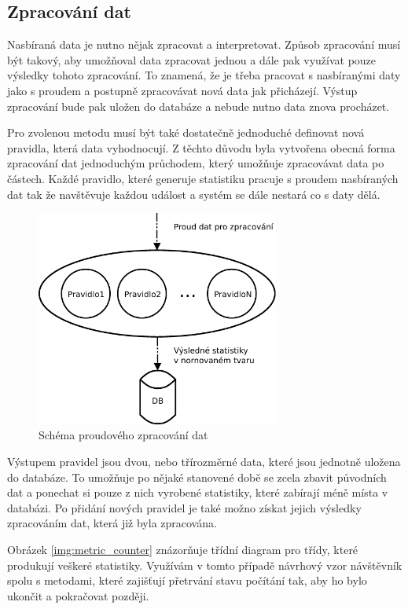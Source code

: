 \documentclass[bc,male,java,dept456]{diploma}						%
\begin{document}
\subsection{Zpracování dat}

Nasbíraná data je nutno nějak zpracovat a interpretovat. Způsob zpracování musí být takový, aby umožňoval data zpracovat jednou a dále pak využívat pouze výsledky tohoto zpracování. To znamená, že je třeba pracovat s nasbíranými daty jako s proudem a postupně zpracovávat nová data jak přicházejí. Výstup zpracování bude pak uložen do databáze a nebude nutno data znova procházet.

Pro zvolenou metodu musí být také dostatečně jednoduché definovat nová pravidla, která data vyhodnocují. Z těchto důvodu byla vytvořena obecná forma zpracování dat jednoduchým průchodem, který umožňuje zpracovávat data po částech. Každé pravidlo, které generuje statistiku pracuje s proudem nasbíraných dat tak že navštěvuje každou událost a systém se dále nestará co s daty dělá.

\begin{figure}[h]
	\centering
	\includegraphics[width=8cm]{img/zpracovani_2.pdf}
	\caption{Schéma proudového zpracování dat}
	\label{img:measuring}
\end{figure}

Výstupem pravidel jsou dvou, nebo třírozměrné data, které jsou jednotně uložena do databáze. To umožňuje po nějaké stanovené době se zcela zbavit původních dat a ponechat si pouze z nich vyrobené statistiky, které zabírají méně místa v databázi. Po přidání nových pravidel je také možno získat jejich výsledky zpracováním dat, která již byla zpracována.

Obrázek \ref{img:metric_counter} znázorňuje třídní diagram pro třídy, které produkují veškeré statistiky. Využívám v tomto případě návrhový vzor návštěvník\cite{visitor} spolu s metodami, které za\-ji\-šťu\-jí přetrvání stavu počítání tak, aby ho bylo ukončit a pokračovat později.
\end{document}
